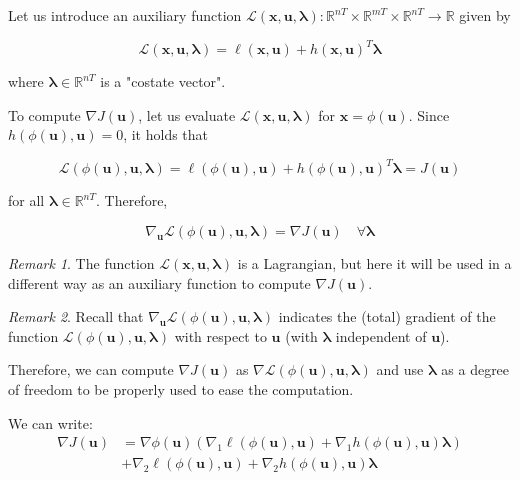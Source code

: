 \documentclass[openany]{book}
\theoremstyle{definition}
\theoremstyle{remark}
\newtheorem*{remark}{Remark}
\begin{document}
Let us introduce an auxiliary function $\mathcal{L}(\mathbf{x}, \mathbf{u}, \boldsymbol{\lambda}) : \mathbb{R}^{nT} \times \mathbb{R}^{mT} \times \mathbb{R}^{nT} \to \mathbb{R}$ given by

\[
\mathcal{L}(\mathbf{x}, \mathbf{u}, \boldsymbol{\lambda}) = \ell(\mathbf{x}, \mathbf{u}) + h(\mathbf{x}, \mathbf{u})^T\boldsymbol{\lambda}
\]

where $\boldsymbol{\lambda} \in \mathbb{R}^{nT}$ is a "costate vector".

To compute $\nabla J(\mathbf{u})$, let us evaluate $\mathcal{L}(\mathbf{x}, \mathbf{u}, \boldsymbol{\lambda})$ for $\mathbf{x} = \phi(\mathbf{u})$. Since $h(\phi(\mathbf{u}), \mathbf{u}) = 0$, it holds that

\[
\mathcal{L}(\phi(\mathbf{u}), \mathbf{u}, \boldsymbol{\lambda}) = \ell(\phi(\mathbf{u}), \mathbf{u}) + h(\phi(\mathbf{u}), \mathbf{u})^T\boldsymbol{\lambda} = J(\mathbf{u})
\]

for all $\boldsymbol{\lambda} \in \mathbb{R}^{nT}$. Therefore,

\[
\nabla_{\mathbf{u}}\mathcal{L}(\phi(\mathbf{u}), \mathbf{u}, \boldsymbol{\lambda}) = \nabla J(\mathbf{u}) \quad \forall \boldsymbol{\lambda}
\]

\begin{remark}
The function $\mathcal{L}(\mathbf{x}, \mathbf{u}, \boldsymbol{\lambda})$ is a Lagrangian, but here it will be used in a different way as an auxiliary function to compute $\nabla J(\mathbf{u})$.
\end{remark}

\begin{remark}
Recall that $\nabla_{\mathbf{u}}\mathcal{L}(\phi(\mathbf{u}), \mathbf{u}, \boldsymbol{\lambda})$ indicates the (total) gradient of the function $\mathcal{L}(\phi(\mathbf{u}), \mathbf{u}, \boldsymbol{\lambda})$ with respect to $\mathbf{u}$ (with $\boldsymbol{\lambda}$ independent of $\mathbf{u}$).
\end{remark}

Therefore, we can compute $\nabla J(\mathbf{u})$ as $\nabla \mathcal{L}(\phi(\mathbf{u}), \mathbf{u}, \boldsymbol{\lambda})$ and use $\boldsymbol{\lambda}$ as a degree of freedom to be properly used to ease the computation.

We can write:
\begin{align*}
\nabla J(\mathbf{u}) &= \nabla\phi(\mathbf{u})(\nabla_1\ell(\phi(\mathbf{u}), \mathbf{u}) + \nabla_1h(\phi(\mathbf{u}), \mathbf{u})\boldsymbol{\lambda}) \\
&+ \nabla_2\ell(\phi(\mathbf{u}), \mathbf{u}) + \nabla_2h(\phi(\mathbf{u}), \mathbf{u})\boldsymbol{\lambda}
\end{align*}
\end{document}
